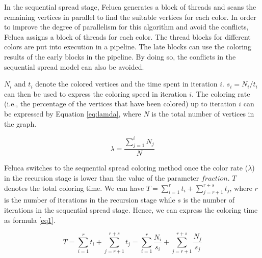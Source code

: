 In the sequential spread stage, %
Feluca generates a block of threads and scans the remaining vertices in parallel to find the suitable vertices for each color. In order to improve the degree of parallelism for this algorithm and avoid the conflicts, Feluca assigns a block of threads for each color. The thread blocks for different colors are put into execution in a pipeline. The late blocks can use the coloring results of the early blocks in the pipeline. By doing so, the conflicts in the sequential spread model can also be avoided. 

$N_i$ and $t_i$ denote the colored vertices and the time spent in iteration $i$. $s_i = N_i / {t_i}$ can then be used to express the coloring speed in iteration $i$. The coloring rate (i.e., the percentage of the vertices that have been colored) up to iteration $i$ can be expressed by Equation \ref{eq:lamda}, where $N$ is the total number of vertices in the graph. 

\begin{equation}
\label{eq:lamda}
\lambda = \frac{\sum_{j=1}^{i}{N_j}}{N}
\end{equation}


Feluca switches to the sequential spread coloring method once the color rate ($\lambda$) in the recursion stage is lower than the value of the parameter $fraction$. $T$ denotes the total coloring time. We can have $T=\sum_{i=1}^{r}{t_i}+\sum_{j=r+1}^{r+s}{t_j}$, where $r$ is the number of iterations in the recursion stage while $s$ is the number of iterations in the sequential spread stage. 
Hence, we can express the coloring time as formula \ref{eq1}.

\begin{equation}
\label{eq1}
		T=\sum_{i=1}^{r}{t_i}+\sum_{j=r+1}^{r+s}{t_j}=\sum_{i=1}^{r}\frac{N_i}{s_i}+\sum_{j=r+1}^{r+s}\frac{N_j}{s_j}
\end{equation}

